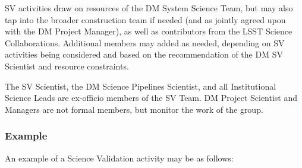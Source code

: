 SV activities draw on resources of the DM System Science Team, but may also
tap into the broader construction team if needed (and as jointly agreed upon
with the DM Project Manager), as well as contributors from the LSST Science
Collaborations.  Additional members may added as needed, depending on SV
activities being considered and based on the recommendation of the DM SV
Scientist and resource constraints.

The SV Scientist, the DM Science Pipelines Scientist, and all Institutional
Science Leads are ex-officio members of the SV Team.  DM Project Scientist and
Managers are not formal members, but monitor the work of the group.

\subsubsection{Example}

An example of a Science Validation activity may be as follows:

